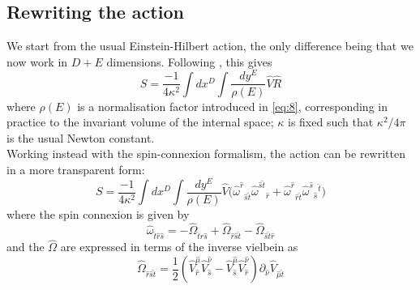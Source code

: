 \documentclass{article}
\begin{document}
\subsection{Rewriting the action}
We start from the usual Einstein-Hilbert action, the only difference being that we now work in $D+E$ dimensions. Following \cite{scherk1979get}, this gives
\begin{equation} \label{eq:8}
    \boxed{S = \frac{-1}{4\kappa^2}\int d x^D \int \frac{d y ^E}{\rho(E)} \hat V \hat R}
\end{equation}
where $\rho(E)$ is a normalisation factor introduced in \eqref{eq:8}, corresponding in practice to the invariant volume of the internal space; $\kappa$ is fixed such that $\kappa^2/4\pi$ is the usual Newton constant.\\
Working instead with the spin-connexion formalism, the action can be rewritten in a more transparent form:
\begin{equation}
        S = \frac{-1}{4\kappa^2}\int d x^D \int \frac{d y ^E}{\rho(E)} \hat V \big(\hat \omega^{\hat r}{}_{\hat s \hat t} \hat \omega^{\hat s \hat t}{}_{\hat r} + \hat \omega^{\hat r}{}_{ \hat r \hat t}\hat \omega^{\hat s }{}_{\hat s}{}^{\hat t}\big)
\end{equation}
where the spin connexion is given by
\begin{equation} \label{eq:10}
    \hat \omega_{ \hat t \hat r \hat s} = - \hat \Omega_{\hat t \hat r \hat s} +\hat \Omega_{\hat r \hat s \hat t} - \hat \Omega_{\hat s \hat t \hat r}  
\end{equation}
and the $\hat \Omega$ are expressed in terms of the inverse vielbein as
\begin{equation} \label{eq:11}
    \hat \Omega_{\hat r \hat s \hat t} = \frac{1}{2}(\hat V^{\hat \mu}_{\hat  r} \hat V^{\hat \nu}_{\hat s}-\hat V^{\hat \mu}_{\hat  s} \hat V^{\hat \nu}_{\hat r})\partial_{\hat \nu} \hat V_{\hat \mu \hat t}
\end{equation}
\end{document}

